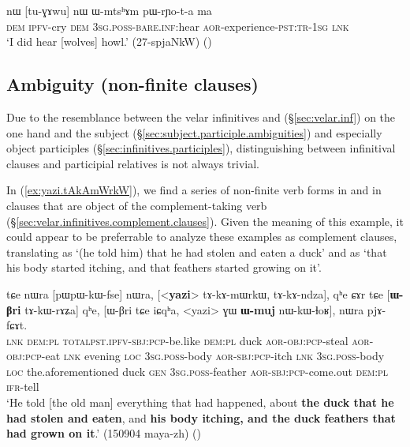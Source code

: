 \begin{exe}
\ex \label{ex:tuGAwu.nW.WmtshAm}
\gll nɯ [tu-ɣɤwu] nɯ ɯ-mtsʰɤm pɯ-rɲo-t-a ma  \\
\textsc{dem} \textsc{ipfv}-cry \textsc{dem} \textsc{3sg}.\textsc{poss}-\textsc{bare}.\textsc{inf}:hear \textsc{aor}-experience-\textsc{pst}:\textsc{tr}-\textsc{1sg} \textsc{lnk} \\
\glt `I did hear [wolves] howl.' (27-spjaNkW)
()
\end{exe}

\subsection{Ambiguity (non-finite clauses)} \label{sec:non-finite.relative.complement.ambiguity}
Due to the resemblance between the velar infinitives  and  (§\ref{sec:velar.inf}) on the one hand and the subject (§\ref{sec:subject.participle.ambiguities}) and especially object participles (§\ref{sec:infinitives.participles}), distinguishing between infinitival clauses and participial relatives is not always trivial.

In (\ref{ex:yazi.tAkAmWrkW}), we find a series of non-finite verb forms in  and  in clauses that are object of the com\-ple\-ment-taking verb  (§\ref{sec:velar.infinitives.complement.clauses}). Given the meaning of this example, it could appear to be preferrable to analyze these examples as complement clauses, translating  as `(he told him) that he had stolen and eaten a duck' and  as `that his body started itching, and that feathers started growing on it'. 

\begin{exe}
\ex \label{ex:yazi.tAkAmWrkW}
\gll tɕe nɯra [pɯ\redp{}pɯ-kɯ-fse] nɯra, [<\textbf{yazi}> tɤ-kɤ-mɯrkɯ, tɤ-kɤ-ndza], qʰe ɕɤr tɕe [\textbf{ɯ-βri} tɤ-kɯ-rɤʑa] qʰe, [ɯ-βri tɕe iɕqʰa, <yazi> ɣɯ \textbf{ɯ-muj} nɯ-kɯ-ɬoʁ], nɯra pjɤ-fɕɤt. \\
\textsc{lnk} \textsc{dem}:\textsc{pl} \textsc{total}\redp{}\textsc{pst}.\textsc{ipfv}-\textsc{sbj}:\textsc{pcp}-be.like \textsc{dem}:\textsc{pl}  duck \textsc{aor}-\textsc{obj}:\textsc{pcp}-steal \textsc{aor}-\textsc{obj}:\textsc{pcp}-eat \textsc{lnk} evening \textsc{loc} \textsc{3sg}.\textsc{poss}-body \textsc{aor}-\textsc{sbj}:\textsc{pcp}-itch \textsc{lnk}   \textsc{3sg}.\textsc{poss}-body \textsc{loc} the.aforementioned duck \textsc{gen} \textsc{3sg}.\textsc{poss}-feather \textsc{aor}-\textsc{sbj}:\textsc{pcp}-come.out \textsc{dem}:\textsc{pl} \textsc{ifr}-tell \\
\glt `He told [the old man] everything that had happened, about \textbf{the duck that he had stolen and eaten}, and \textbf{his body itching, and the duck feathers that had grown on it}.' (150904 maya-zh)
()
 \end{exe}

